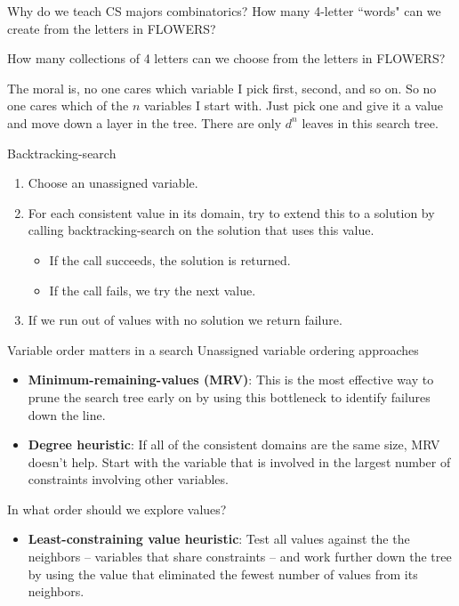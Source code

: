 \documentclass{beamer}
\begin{document}
\begin{frame}{Why do we teach CS majors combinatorics?}
\small
    How many 4-letter ``words" can we create from the letters in FLOWERS?

    \vspace{1in}
    How many collections of 4 letters can we choose from the letters in FLOWERS?
    
    \vspace{1in}
    The moral is, no one cares which variable I pick first, second, and so on. So no one cares which of the $n$ variables I start with. Just pick one and give it a value and move down a layer in the tree. There are only $d^n$ leaves in this search tree. 

\end{frame}

\begin{frame}{Backtracking-search}
    \begin{enumerate}
        \item Choose an unassigned variable.
        \item For each consistent value in its domain, try to extend this to a solution by calling backtracking-search on the solution that uses this value.
        \begin{itemize}
            \item If the call succeeds, the solution is returned.
            \item If the call fails, we try the next value.
        \end{itemize}
        \item If we run out of values with no solution we return failure.
    \end{enumerate}
    
    
\end{frame}

\begin{frame}{Variable order matters in a search}
    Unassigned variable ordering approaches
    \begin{itemize}
        \item {\bf Minimum-remaining-values (MRV)}: This is the most effective
        way to prune the search tree early on by using this bottleneck to identify failures down the line.
        \item {\bf Degree heuristic}: If all of the consistent domains are the same size, MRV doesn't help. Start with the variable that is involved in 
        the largest number of constraints involving other variables.
    \end{itemize}

    In what order should we explore values?

    \begin{itemize}
        \item {\bf Least-constraining value heuristic}: Test all values against the the neighbors -- variables that share constraints -- and work further down the tree by using the value that eliminated the fewest number of values from its neighbors.
    \end{itemize}
    
\end{frame}
\end{document}
